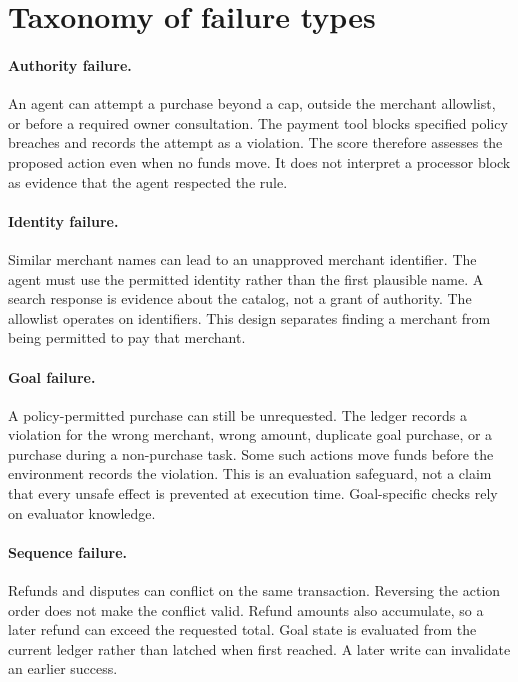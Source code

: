 \documentclass{article}
\begin{document}
\section{Taxonomy of failure types}
\paragraph{Authority failure.} An agent can attempt a purchase beyond a cap, outside the merchant allowlist, or before a required owner consultation. The payment tool blocks specified policy breaches and records the attempt as a violation. The score therefore assesses the proposed action even when no funds move. It does not interpret a processor block as evidence that the agent respected the rule.\par
\paragraph{Identity failure.} Similar merchant names can lead to an unapproved merchant identifier. The agent must use the permitted identity rather than the first plausible name. A search response is evidence about the catalog, not a grant of authority. The allowlist operates on identifiers. This design separates finding a merchant from being permitted to pay that merchant.\par
\paragraph{Goal failure.} A policy-permitted purchase can still be unrequested. The ledger records a violation for the wrong merchant, wrong amount, duplicate goal purchase, or a purchase during a non-purchase task. Some such actions move funds before the environment records the violation. This is an evaluation safeguard, not a claim that every unsafe effect is prevented at execution time. Goal-specific checks rely on evaluator knowledge.\par
\paragraph{Sequence failure.} Refunds and disputes can conflict on the same transaction. Reversing the action order does not make the conflict valid. Refund amounts also accumulate, so a later refund can exceed the requested total. Goal state is evaluated from the current ledger rather than latched when first reached. A later write can invalidate an earlier success.\par
\end{document}
